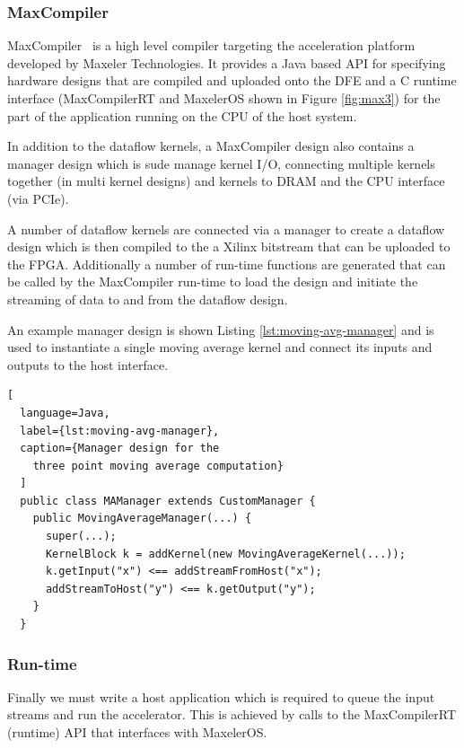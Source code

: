 \subsubsection{MaxCompiler}

\label{sec:back--maxcompiler}

MaxCompiler~\cite{5719584} is a high level compiler targeting the
acceleration platform developed by Maxeler Technologies. It provides a
Java based API for specifying hardware designs that are compiled and
uploaded onto the DFE and a C runtime interface (MaxCompilerRT and
MaxelerOS shown in Figure \ref{fig:max3}) for the part of the
application running on the CPU of the host system.

In addition to the dataflow kernels, a MaxCompiler design also
contains a manager design which is sude manage kernel I/O, connecting
multiple kernels together (in multi kernel designs) and kernels to
DRAM and the CPU interface (via PCIe).

A number of dataflow kernels are connected via a manager to create a
dataflow design which is then compiled to the a Xilinx bitstream that
can be uploaded to the FPGA. Additionally a number of run-time
functions are generated that can be called by the MaxCompiler run-time
to load the design and initiate the streaming of data to and from the
dataflow design.

An example manager design is shown Listing
\ref{lst:moving-avg-manager} and is used to instantiate a single
moving average kernel and connect its inputs and outputs to the host
interface.

\begin{lstlisting}[
  language=Java,
  label={lst:moving-avg-manager},
  caption={Manager design for the
    three point moving average computation}
  ]
  public class MAManager extends CustomManager {
    public MovingAverageManager(...) {
      super(...);
      KernelBlock k = addKernel(new MovingAverageKernel(...));
      k.getInput("x") <== addStreamFromHost("x");
      addStreamToHost("y") <== k.getOutput("y");
    }
  }
\end{lstlisting}

\subsubsection{Run-time}
Finally we must write a host application which is required to queue
the input streams and run the accelerator. This is achieved by calls
to the MaxCompilerRT (runtime) API that interfaces with MaxelerOS.

